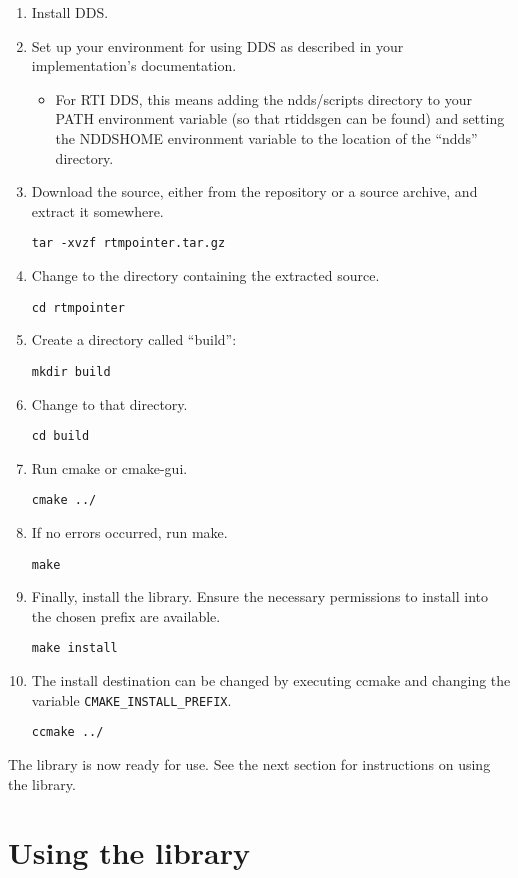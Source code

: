 \documentclass[a4paper,10pt]{article}
\newcommand{\ilcode}[1]{\lstinline|#1|}
\begin{document}
\begin{enumerate}
  \item Install DDS.

  \item Set up your environment for using DDS as described in your
  implementation's documentation.
  \begin{itemize}
    \item For RTI DDS, this means adding the ndds/scripts directory to
    your PATH environment variable (so that rtiddsgen can be found) and
    setting the NDDSHOME environment variable to the location of the
    ``ndds'' directory.
  \end{itemize}

  \item Download the source, either from the repository or a source archive,
  and extract it somewhere.

  \ilcode{tar -xvzf rtmpointer.tar.gz}
  \item Change to the directory containing the extracted source.

  \ilcode{cd rtmpointer}
  \item Create a directory called ``build'':

  \ilcode{mkdir build}
  \item Change to that directory.

  \ilcode{cd build}
  \item Run cmake or cmake-gui.

  \ilcode{cmake ../}
  \item If no errors occurred, run make.

  \ilcode{make}
  \item Finally, install the library. Ensure the necessary permissions
  to install into the chosen prefix are available.

  \ilcode{make install}
  \item The install destination can be changed by executing ccmake and
  changing the variable \ilcode{CMAKE_INSTALL_PREFIX}.

  \ilcode{ccmake ../}
\end{enumerate}

The library is now ready for use. See the next section for instructions on
using the library.

\section{Using the library}
\label{sec:usage}
\end{document}
